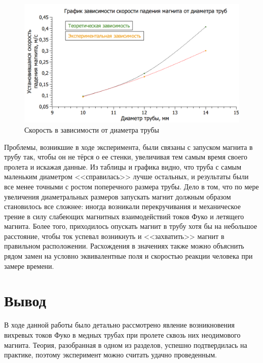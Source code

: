 \documentclass[a4paper,12pt]{article} %
\begin{document}
\begin{figure}[h!]
	\centering
	\includegraphics[scale=0.75]{граф.png}
	\caption{Скорость в зависимости от диаметра трубы}
\end{figure}

Проблемы, возникшие в ходе эксперимента, были связаны с запуском магнита в трубу так, чтобы он не тёрся о ее стенки, увеличивая тем самым время своего пролета и искажая данные. Из таблицы и графика видно, что труба с самым маленьким диаметром <<справилась>> лучше остальных, и результаты были все менее точными с ростом поперечного размера трубы. Дело в том, что по мере увеличения диаметральных размеров запускать магнит должным образом становилось все сложнее: иногда возникали перекручивания и механическое трение в силу слабеющих магнитных взаимодействий токов Фуко и летящего магнита. Более того, приходилось опускать магнит в трубу хотя бы на небольшое расстояние, чтобы ток успевал возникнуть и <<захватить>> магнит в правильном расположении. Расхождения в значениях также можно объяснить рядом замен на условно эквивалентные поля и скоростью реакции человека при замере времени.

\newpage


\section{Вывод}

В ходе данной работы было детально рассмотрено явление возникновения вихревых токов Фуко в медных трубах при пролете сквозь них неодимового магнита. Теория, разобранная в одном из разделов, успешно подтвердилась на практике, поэтому эксперимент можно считать удачно проведенным. 
\end{document}
